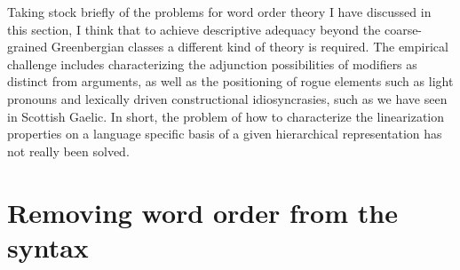 \documentclass[output=paper,colorlinks,citecolor=brown]{langscibook}
\begin{document}
\ea
{}
\z
\z
Taking stock briefly of the problems for word order theory I have discussed in this section, I think that to achieve descriptive adequacy beyond the coarse-grained Greenbergian classes a different kind of theory is required. The empirical challenge includes  characterizing the adjunction possibilities of modifiers as distinct from arguments, as well as the positioning of rogue elements such as light pronouns and lexically driven constructional idiosyncrasies, such as we have seen in Scottish Gaelic. In short, the problem of how to characterize the linearization properties on a language specific basis of a given  hierarchical representation  has not really been solved. 

\section{Removing word order from the syntax}\label{sec:ramchand:4}
\end{document}

